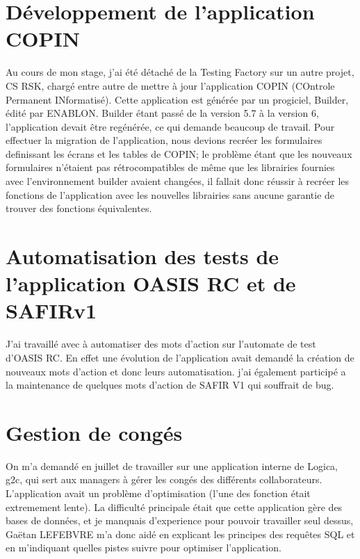 \section{Développement de l'application COPIN}

Au cours de mon stage, j'ai été détaché de la Testing Factory sur un autre projet, CS RSK, chargé entre autre de mettre à jour
l'application COPIN (COntrole Permanent INformatisé). Cette application est générée par un progiciel, Builder, édité par ENABLON. Builder étant passé de la version 5.7 à la version 6, l'application devait être regénérée, ce qui demande beaucoup de travail. Pour effectuer la migration de l'application, nous devions recréer les formulaires definissant les écrans et les tables de COPIN; le problème étant que les nouveaux formulaires n'étaient pas rétrocompatibles de même que les librairies fournies avec l'environnement builder avaient changées, il fallait donc réussir à recréer les fonctions de l'application avec les nouvelles librairies sans aucune garantie de trouver des fonctions équivalentes.

\section{Automatisation des tests de l'application OASIS RC et de SAFIRv1}
J'ai travaillé avec à automatiser des mots d'action sur l'automate de test d'OASIS RC. En effet une évolution de l'application avait demandé la création de nouveaux mots d'action et donc leurs automatisation. j'ai également participé a la maintenance de quelques mots d'action de SAFIR V1 qui souffrait de bug.

\section{Gestion de congés}
On m'a demandé en juillet de travailler sur une application interne de Logica, g2c, qui sert aux managers à gérer les congés des différents collaborateurs. L'application avait un problème d'optimisation (l'une des fonction était extremement lente). La difficulté principale était que cette application gère des bases de données, et je manquais d'experience pour pouvoir travailler seul dessus, Gaëtan LEFEBVRE m'a donc aidé en explicant les principes des requêtes SQL et en m'indiquant quelles pistes suivre pour optimiser l'application.  
